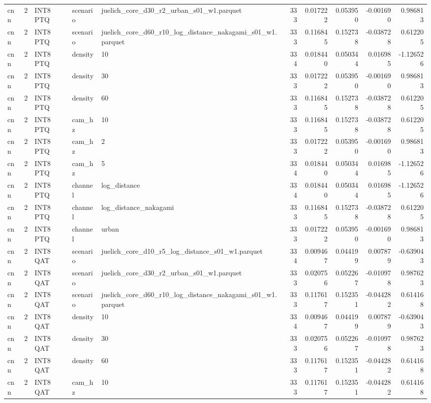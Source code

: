 \begin{tabular}{lrlllrrrrr}
cnn & 2 & INT8 PTQ & scenario & juelich\_core\_d30\_r2\_urban\_s01\_w1.parquet & 333 & 0.017222 & 0.053950 & -0.001690 & 0.986813 \\
cnn & 2 & INT8 PTQ & scenario & juelich\_core\_d60\_r10\_log\_distance\_nakagami\_s01\_w1.parquet & 333 & 0.116845 & 0.152738 & -0.038728 & 0.612205 \\
cnn & 2 & INT8 PTQ & density & 10 & 334 & 0.018440 & 0.050344 & 0.016985 & -1.126526 \\
cnn & 2 & INT8 PTQ & density & 30 & 333 & 0.017222 & 0.053950 & -0.001690 & 0.986813 \\
cnn & 2 & INT8 PTQ & density & 60 & 333 & 0.116845 & 0.152738 & -0.038728 & 0.612205 \\
cnn & 2 & INT8 PTQ & cam\_hz & 10 & 333 & 0.116845 & 0.152738 & -0.038728 & 0.612205 \\
cnn & 2 & INT8 PTQ & cam\_hz & 2 & 333 & 0.017222 & 0.053950 & -0.001690 & 0.986813 \\
cnn & 2 & INT8 PTQ & cam\_hz & 5 & 334 & 0.018440 & 0.050344 & 0.016985 & -1.126526 \\
cnn & 2 & INT8 PTQ & channel & log\_distance & 334 & 0.018440 & 0.050344 & 0.016985 & -1.126526 \\
cnn & 2 & INT8 PTQ & channel & log\_distance\_nakagami & 333 & 0.116845 & 0.152738 & -0.038728 & 0.612205 \\
cnn & 2 & INT8 PTQ & channel & urban & 333 & 0.017222 & 0.053950 & -0.001690 & 0.986813 \\
cnn & 2 & INT8 QAT & scenario & juelich\_core\_d10\_r5\_log\_distance\_s01\_w1.parquet & 334 & 0.009467 & 0.044199 & 0.007879 & -0.639043 \\
cnn & 2 & INT8 QAT & scenario & juelich\_core\_d30\_r2\_urban\_s01\_w1.parquet & 333 & 0.020756 & 0.052267 & -0.010978 & 0.987623 \\
cnn & 2 & INT8 QAT & scenario & juelich\_core\_d60\_r10\_log\_distance\_nakagami\_s01\_w1.parquet & 333 & 0.117617 & 0.152351 & -0.044282 & 0.614168 \\
cnn & 2 & INT8 QAT & density & 10 & 334 & 0.009467 & 0.044199 & 0.007879 & -0.639043 \\
cnn & 2 & INT8 QAT & density & 30 & 333 & 0.020756 & 0.052267 & -0.010978 & 0.987623 \\
cnn & 2 & INT8 QAT & density & 60 & 333 & 0.117617 & 0.152351 & -0.044282 & 0.614168 \\
cnn & 2 & INT8 QAT & cam\_hz & 10 & 333 & 0.117617 & 0.152351 & -0.044282 & 0.614168 \\

\end{tabular}
